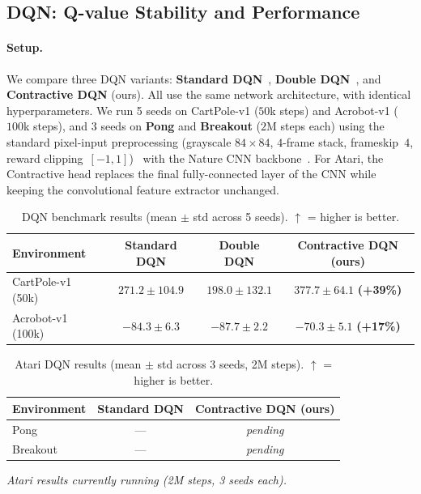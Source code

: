 \documentclass{article}
\begin{document}
\subsection{DQN: Q-value Stability and Performance}
\label{sec:exp_dqn}

\paragraph{Setup.}
We compare three DQN variants: \textbf{Standard DQN}~\citep{mnih2015human},
\textbf{Double DQN}~\citep{van2016deep}, and \textbf{Contractive DQN} (ours).
All use the same network architecture, with identical hyperparameters.
We run 5 seeds on CartPole-v1 ($50$k steps) and Acrobot-v1 ($100$k steps), and
3 seeds on \textbf{Pong} and \textbf{Breakout} ($2$M steps each) using the standard
pixel-input preprocessing (grayscale $84\times84$, $4$-frame stack, frameskip~$4$,
reward clipping~$[-1,1]$)~\citep{mnih2015human,brockman2016openai} with the
Nature CNN backbone~\citep{mnih2015human}.
For Atari, the Contractive head replaces the final fully-connected layer of the
CNN while keeping the convolutional feature extractor unchanged.

\begin{table}[t]
  \centering
  \caption{DQN benchmark results (mean $\pm$ std across 5 seeds). $\uparrow$ = higher is better.}
  \label{tab:dqn}
  \small
  \begin{tabular}{lccc}
    \toprule
    Environment & Standard DQN & Double DQN & \textbf{Contractive DQN} (ours) \\
    \midrule
    CartPole-v1 (50k)  & $271.2 \pm 104.9$ & $198.0 \pm 132.1$ & $\mathbf{377.7 \pm 64.1}$ \textbf{(+39\%)} \\
    Acrobot-v1 (100k)  & $-84.3 \pm 6.3$   & $-87.7 \pm 2.2$   & $\mathbf{-70.3 \pm 5.1}$ \textbf{(+17\%)} \\
    \bottomrule
  \end{tabular}
\end{table}

\begin{table}[t]
  \centering
  \caption{Atari DQN results (mean $\pm$ std across 3 seeds, 2M steps). $\uparrow$ = higher is better.}
  \label{tab:atari}
  \small
  \begin{tabular}{lcc}
    \toprule
    Environment & Standard DQN & \textbf{Contractive DQN} (ours) \\
    \midrule
    Pong      & ---  & \textit{pending} \\
    Breakout  & ---  & \textit{pending} \\
    \bottomrule
  \end{tabular}
  \vspace{0.3em}
  \small\textit{Atari results currently running (2M steps, 3 seeds each).}
\end{table}
\end{document}
